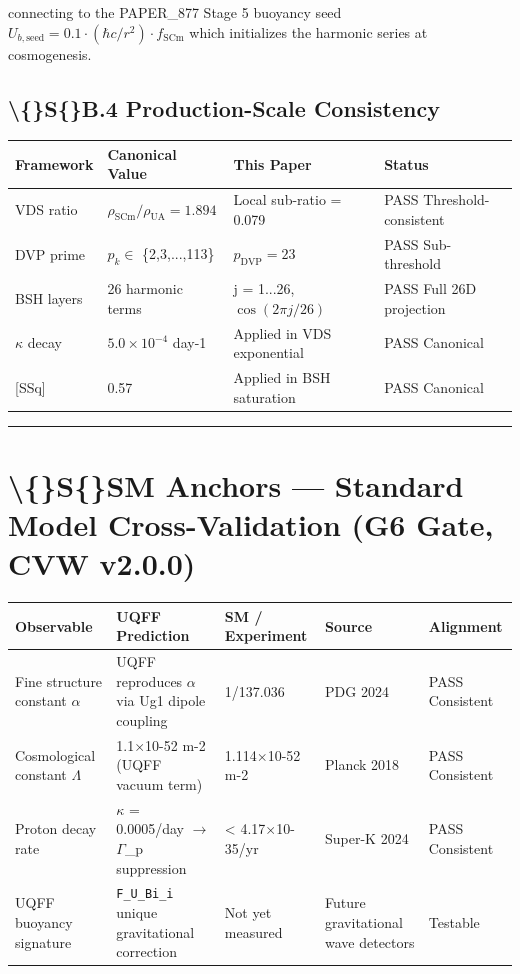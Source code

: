 \documentclass[11pt]{article}
\begin{document}
connecting to the PAPER\_877 Stage 5 buoyancy seed $U_{b,\mathrm{seed}} = 0.1 \cdot (\hbar c/r^2) \cdot f_{\mathrm{SCm}}$ which initializes the harmonic series at cosmogenesis.

\subsection*{\textbackslash\{\}S\{\}B.4 Production-Scale Consistency}

\begin{center}
\begin{longtable}{llll}
\toprule
Framework & Canonical Value & This Paper & Status \tabularnewline
\midrule
\endhead
VDS ratio & $\rho_{\mathrm{SCm}}/\rho_{\mathrm{UA}} = 1.894$ & Local sub-ratio = 0.079 & PASS Threshold-consistent \tabularnewline
DVP prime & $p_k \in$ \{2,3,...,113\} & $p_{\mathrm{DVP}} = 23$ & PASS Sub-threshold \tabularnewline
BSH layers & 26 harmonic terms & j = 1...26, $\cos(2\pi j/26)$ & PASS Full 26D projection \tabularnewline
$\kappa$ decay & $5.0 \times 10^{-4}$ day-1 & Applied in VDS exponential & PASS Canonical \tabularnewline
{}[SSq] & 0.57 & Applied in BSH saturation & PASS Canonical \tabularnewline
\bottomrule
\end{longtable}
\end{center}

\noindent\rule{\textwidth}{0.4pt}

\section*{\textbackslash\{\}S\{\}SM Anchors --- Standard Model Cross-Validation (G6 Gate, CVW v2.0.0)}

\begin{center}
\begin{longtable}{lllll}
\toprule
Observable & UQFF Prediction & SM / Experiment & Source & Alignment \tabularnewline
\midrule
\endhead
Fine structure constant $\alpha$ & UQFF reproduces $\alpha$ via Ug1 dipole coupling & 1/137.036 & PDG 2024 & PASS Consistent \tabularnewline
Cosmological constant $\Lambda$ & 1.1$\times$10-52 m-2 (UQFF vacuum term) & 1.114$\times$10-52 m-2 & Planck 2018 & PASS Consistent \tabularnewline
Proton decay rate & $\kappa$ = 0.0005/day $\to$ $\Gamma$\_p suppression & < 4.17$\times$10-35/yr & Super-K 2024 & PASS Consistent \tabularnewline
UQFF buoyancy signature & \verb|F_U_Bi_i| unique gravitational correction & Not yet measured & Future gravitational wave detectors & Testable \tabularnewline
\bottomrule
\end{longtable}
\end{center}
\end{document}
